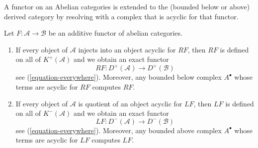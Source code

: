 \begin{proposition}
\label{proposition-enough-acyclics}
\begin{slogan}
A functor on an Abelian categories is extended to the (bounded below or above)
derived category by resolving with a complex that is acyclic for that functor.
\end{slogan}
Let $F : \mathcal{A} \to \mathcal{B}$ be an additive functor of
abelian categories.
\begin{enumerate}
\item If every object of $\mathcal{A}$ injects into an object acyclic
for $RF$, then $RF$ is defined on all of $K^{+}(\mathcal{A})$
and we obtain an exact functor
$$
RF : D^{+}(\mathcal{A}) \longrightarrow D^{+}(\mathcal{B})
$$
see (\ref{equation-everywhere}). Moreover, any bounded below complex
$A^\bullet$ whose terms are acyclic for $RF$ computes $RF$.
\item If every object of $\mathcal{A}$ is quotient of
an object acyclic for $LF$, then $LF$ is defined on all of
$K^{-}(\mathcal{A})$ and we obtain an exact functor
$$
LF : D^{-}(\mathcal{A}) \longrightarrow D^{-}(\mathcal{B})
$$
see (\ref{equation-everywhere}). Moreover, any bounded above complex
$A^\bullet$ whose terms are acyclic for $LF$ computes $LF$.
\end{enumerate}
\end{proposition}

